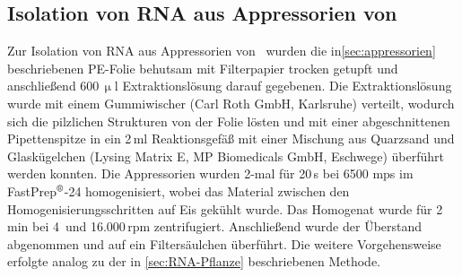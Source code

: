 \subsection{Isolation von RNA aus Appressorien von \Ppach}
Zur Isolation von RNA aus Appressorien von \Ppach\ wurden die in\ref{sec:appressorien} beschriebenen PE-Folie behutsam mit Filterpapier trocken getupft und anschließend 600\,$\upmu$l Extraktionslösung darauf gegebenen. Die Extraktionslösung wurde mit einem Gummiwischer (Carl Roth GmbH, Karlsruhe) verteilt, wodurch sich die pilzlichen Strukturen von der Folie lösten und mit einer abgeschnittenen Pipettenspitze in ein 2\,ml Reaktionsgefäß mit einer Mischung aus Quarzsand und Glaskügelchen (Lysing Matrix E, MP Biomedicals GmbH, Eschwege) überführt werden konnten. Die Appressorien wurden 2-mal für 20\,s bei 6500 \acs{mps} im FastPrep$\textsuperscript{\textregistered}$-24 homogenisiert, wobei das Material zwischen den Homogenisierungsschritten auf Eis gekühlt wurde. Das Homogenat wurde für 2\,min bei 4\celcius\ und 16.000\,rpm zentrifugiert. Anschließend wurde der Überstand abgenommen und auf ein Filtersäulchen überführt. Die weitere Vorgehensweise erfolgte analog zu der in \ref{sec:RNA-Pflanze} beschriebenen Methode. 